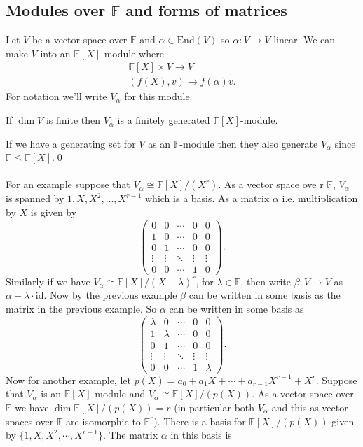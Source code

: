 \documentclass{article}
\newcommand{\F}{\mathbb{F}}
\begin{document}
\begin{itemize}
\subsection{Modules over $ \F $ and forms of matrices}
Let $ V $ be a vector space over $ \F $ and $ \alpha\in\mathrm{End}(V) $ so $ \alpha:V\to V $ linear. We can make $ V $ into an $ \F[X] $-module where
\begin{align*}
	\F[X]\times V\to V \\
	(f(X), v)\to f(\alpha)v.
\end{align*}
For notation we'll write $ V_\alpha $ for this module.
\begin{lemma}
	If $ \dim V $ is finite then $ V_\alpha $ is a finitely generated $ \F[X] $-module.
\end{lemma}
If we have a generating set for $ V $ as an $ \F $-module then they also generate $ V_\alpha $ since $ \F\le \F[X] $.\qed
\\\\
For an example suppose that $ V_\alpha\cong \F[X]/(X^r) $. As a vector space ove r $ \F $, $ V_\alpha $ is spanned by $ 1,X,X^2,\dots, X^{r-1} $ which is a basis. As a matrix $ \alpha $ i.e. multiplication by $ X $ is given by
\[
  \begin{pmatrix}
	  0 & 0 & \cdots & 0 & 0 \\
	  1 & 0 & \cdots & 0 & 0 \\
	  0 & 1 & \cdots & 0 & 0 \\
	  \vdots & \vdots & \ddots & \vdots & \vdots \\
	  0 & 0 & \cdots & 1 & 0
  \end{pmatrix}.
\]
Similarly if we have $ V_\alpha\cong \F[X]/(X-\lambda)^r $, for $ \lambda\in \F $, then write $ \beta:V\to V $ as $ \alpha-\lambda\cdot \mathrm{id} $. Now by the previous example $ \beta $ can be written in some basis as the matrix in the previous example. So $ \alpha $ can be written in some basis as
\[
  \begin{pmatrix}
	  \lambda & 0 & \cdots & 0 & 0 \\
	  1 & \lambda & \cdots & 0 & 0 \\
	  0 & 1 & \cdots & 0 & 0 \\
	  \vdots & \vdots & \ddots & \vdots & \vdots \\
	  0 & 0 & \cdots & 1 & \lambda
  \end{pmatrix}.
\]
Now for another example, let $ p(X) = a_0 + a_1X+\cdots +a_{r-1}X^{r-1} + X^r$. Suppose that $ V_\alpha $ is an $ \F[X] $ module and $ V_\alpha\cong \F[X]/(p(X)) $. As a vector space over $ \F $ we have $ \dim \F[X]/(p(X)) = r $ (in particular both $ V_\alpha $ and this as vector spaces over $ \F $ are isomorphic to $ \F^r $). There is a basis for $ \F[X]/(p(X)) $ given by $ \{1,X,X^2,\cdots,X^{r-1}\} $. The matrix $ \alpha $ in this basis is

\end{itemize}
\end{document}
